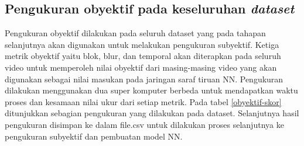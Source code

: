 \subsection{Pengukuran obyektif pada keseluruhan \textit{dataset}}
\hspace{1.2cm}
Pengukuran obyektif dilakukan pada seluruh dataset yang pada tahapan selanjutnya akan digunakan untuk melakukan pengukuran subyektif. Ketiga metrik obyektif yaitu blok, blur, dan temporal akan diterapkan pada seluruh video untuk memperoleh nilai obyektif dari masing-masing video yang akan digunakan sebagai nilai masukan pada jaringan saraf tiruan NN. Pengukuran dilakukan menggunakan dua super komputer berbeda untuk mendapatkan waktu proses dan kesamaan nilai ukur dari setiap metrik. Pada tabel \ref{obyektif-skor} ditunjukkan sebagian pengukuran yang dilakukan pada dataset. Selanjutnya hasil pengukuran disimpan ke dalam file.csv untuk dilakukan proses selanjutnya ke pengukuran subyektif dan pembuatan model NN.

